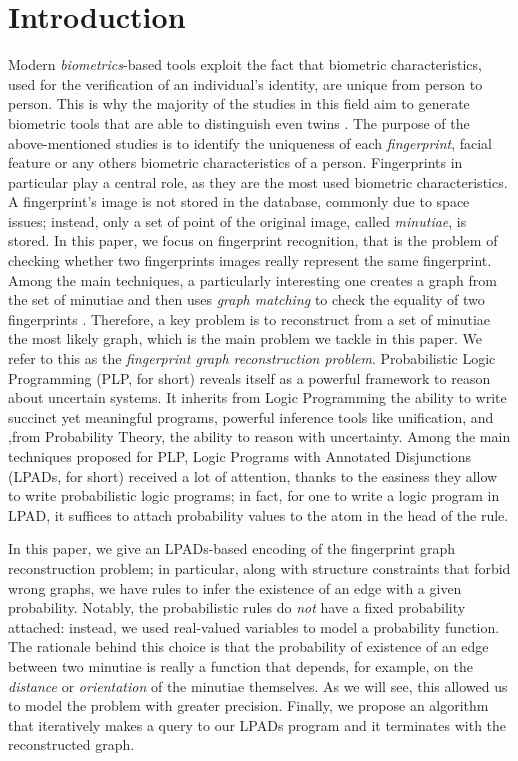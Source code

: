 \documentclass[8pt]{article}
\begin{document}
\section{Introduction}
Modern \textit{biometrics}-based tools exploit the fact that biometric
characteristics, used for the verification of an individual’s identity, are
unique from person to person\cite{maltoni2009handbook}.  This is why the
majority of the studies in this
field aim to generate biometric tools that are able to distinguish even twins
\cite{jain2001twin,jain2002similarity}.
%
The purpose of the above-mentioned studies is to identify the uniqueness of each
\textit{fingerprint}, facial feature or any others biometric characteristics of
a person. Fingerprints in particular play a central role, as they are
 the most used biometric characteristics. A fingerprint's image is not
stored in the database, commonly due to space issues; instead, only a set of
point of the original image, called \emph{minutiae}, is stored.
In this paper, we focus on fingerprint recognition, that is the problem of
checking whether two fingerprints images really represent the same fingerprint.
%
Among the main techniques, a particularly interesting one creates a graph from
the set of minutiae and then uses \emph{graph matching} to check the equality
of two fingerprints \cite{isenor1986fingerprint}. Therefore, a key problem is
to reconstruct from a set of minutiae the most likely graph, which is the main
problem we tackle in this paper. We refer to this as the \emph{fingerprint
graph reconstruction problem}.
Probabilistic Logic Programming (PLP, for short) reveals itself as a powerful
framework to reason about uncertain systems. It inherits from Logic Programming
the ability to write succinct yet meaningful programs, powerful inference
tools like unification, and ,from Probability Theory, the ability to reason
with uncertainty.
Among the main techniques proposed for PLP, Logic Programs with Annotated
Disjunctions (LPADs, for short) received a lot of attention, thanks to the
easiness they allow to write probabilistic logic programs; in fact, for one to
write a logic program in LPAD, it suffices to attach probability values to
the atom in the head of the rule.

In this paper, we give an LPADs-based encoding of the fingerprint graph
reconstruction problem; in particular, along with structure constraints that
forbid wrong graphs, we have rules to infer the existence of an edge with
a given probability. Notably, the probabilistic rules do \emph{not} have
a fixed probability attached: instead, we used real-valued variables to model
a probability function. The rationale behind this choice is that the
probability of existence of an edge between two minutiae is really a function
that depends, for example, on the \emph{distance} or \emph{orientation} of the minutiae themselves.
As we
will see, this allowed us to model the problem with greater precision.
Finally, we propose an algorithm that iteratively makes a query to our LPADs
program and it terminates with the reconstructed graph. 
\end{document}
